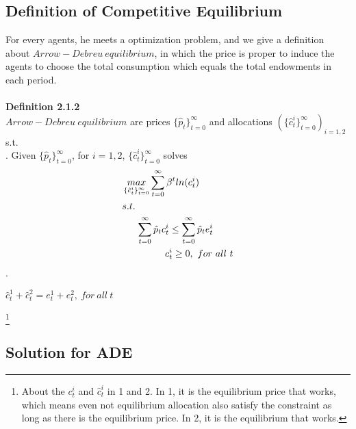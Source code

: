 \documentclass{article}
\begin{document}
\subsection{Definition of Competitive Equilibrium}
For every agents, he meets a optimization problem, and we give a definition about  $Arrow-Debreu\ equilibrium$, in which the price is proper to induce the agents to choose the total consumption which equals the total endowments in each period.\\\\
\textbf{Definition 2.1.2}\\
$Arrow-Debreu\ equilibrium$ are prices $\{\hat{p}_t\}^\infty_{t=0}$ and allocations $(\{\hat{c}^i_t\}^\infty_{t=0})_{i=1,2}$ s.t. \\
. Given $\{\hat{p}_t\}^\infty_{t=0}$, for $i = 1, 2$, $\{\hat{c}^i_t\}^\infty_{t=0}$ solves
\begin{align*}
	& \mathop{max}\limits_{\{\hat{c}^i_t\}^\infty_{t=0}} \sum\limits^\infty_{t=0} \beta^t ln(c^i_t)\\
	&s.t.\\
	&\indent \sum\limits^\infty_{t=0} \hat{p}_t c^i_t \leq \sum\limits^\infty_{t=0} \hat{p}_t e^i_t\\
	&\indent \indent \indent c^i_t \geq 0,\ for\ all\ t
\end{align*}
.\\
\centerline{$\hat{c}^1_t + \hat{c}^2_t = e^1_t + e^2_t,\ for\ all\ t$}\footnote{
About the $c^i_t$ and $\hat{c}^i_t$ in 1 and 2. In 1, it is the equilibrium price that works, which means even not equilibrium allocation also satisfy the constraint as long as there is the equilibrium price. In 2, it is the equilibrium that works.}


\subsection{Solution for ADE}
\end{document}
